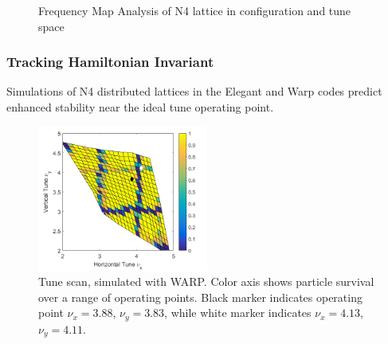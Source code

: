 \begin{figure}
 	\caption{Frequency Map Analysis of N4 lattice in configuration and tune space}
   \label{fig:N4fma}
\end{figure}







\subsubsection{Tracking Hamiltonian Invariant}

Simulations of N4 distributed lattices in the Elegant and Warp codes predict enhanced stability near the ideal tune operating point. 

\begin{figure}[]
   \centering
    \includegraphics[width=0.5\textwidth]{6.figures/warp_tune_scan_plot.png}
 	\caption{Tune scan, simulated with WARP. Color axis shows particle survival over a range of operating points. Black marker indicates operating point $\nu_x=3.88$, $\nu_y=3.83$, while white marker indicates $\nu_x=4.13$, $\nu_y=4.11$.}
   \label{fig:warpscan}
\end{figure}

